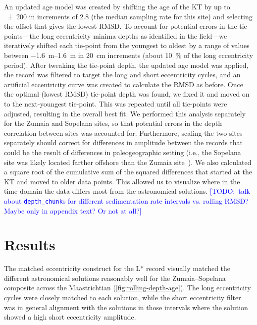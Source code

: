 \documentclass[draft]{agujournal2019}
\newcommand{\rez}{\textcolor{magenta}}
\newcommand{\ijk}{\textcolor{blue}}
\begin{document}
An updated age model was created by shifting the age of the \gls{KT}
by up to \qty{\pm200}{\kiloyear} in increments of \qty{2.8}{\kiloyear} (the median sampling rate for this site)
and selecting the offset that gives the lowest \gls{RMSD}.
To account for potential errors in the tie-points---the long eccentricity minima depths as identified in the field---we iteratively shifted each tie-point from the youngest to oldest by a range of values between \qtyrange[range-phrase=~to~]{-1.6}{1.6}{\metre} in \qty{20}{\centi\metre} increments (about \qty{10}{\percent} of the long eccentricity period).
After tweaking the tie-point depth, the updated age model was applied, the record was filtered to target the long and short eccentricity cycles, and an artificial eccentricity curve was created to calculate the \gls{RMSD} as before.
Once the optimal (lowest \gls{RMSD}) tie-point depth was found, we fixed it and moved on to the next-youngest tie-point.
This was repeated until all tie-points were adjusted, resulting in the overall best fit.
We performed this analysis separately for the Zumaia and Sopelana sites, so that potential errors in the depth correlation between sites was accounted for.
Furthermore,  scaling the two sites separately should correct for differences in amplitude between the records that could be the result of differences in paleogeographic setting (i.e., the Sopelana site was likely located farther offshore than the Zumaia site~\cite{Batenburg2014}).
We also calculated a square root of the cumulative sum of the squared differences that started at the \gls{KT} and moved to older data points.
This allowed us to visualize where in the time domain the data differs most from the astronomical solutions.
\ijk{[TODO:\ talk about \texttt{depth\_chunk}s for different sedimentation rate intervals vs. rolling RMSD? Maybe only in appendix text? Or not at all?]}

\section{Results}\label{sec:results}

The matched eccentricity construct for the \gls{L*} record visually matched the different astronomical solutions reasonably well for the Zumaia--Sopelana composite across the Maastrichtian (\cref{fig:rolling-depth-age}). %
The long eccentricity cycles were closely matched to each solution, while the short eccentricity filter was in general alignment with the solutions in those intervals where the solution showed a high short eccentricity amplitude.
\end{document}
